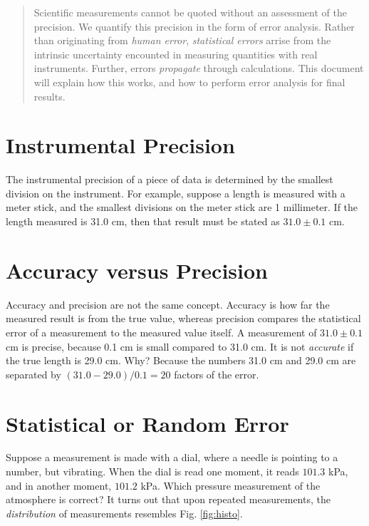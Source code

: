 \documentclass[12pt]{article}
\begin{document}
\maketitle

\begin{abstract}
Scientific measurements cannot be quoted without an assessment of the precision.  We quantify this precision in the form of error analysis.  Rather than originating from \textit{human error}, \textit{statistical errors} arrise from the intrinsic uncertainty encounted in measuring quantities with real instruments.  Further, errors \textit{propagate} through calculations.  This document will explain how this works, and how to perform error analysis for final results.
\end{abstract}

\section{Instrumental Precision}

The instrumental precision of a piece of data is determined by the smallest division on the instrument.  For example, suppose a length is measured with a meter stick, and the smallest divisions on the meter stick are 1 millimeter.  If the length measured is 31.0 cm, then that result must be stated as $31.0\pm0.1$ cm.

\section{Accuracy versus Precision}

Accuracy and precision are not the same concept.  Accuracy is how far the measured result is from the true value, whereas precision compares the statistical error of a measurement to the measured value itself.  A measurement of $31.0\pm0.1$ cm is precise, because 0.1 cm is small compared to 31.0 cm.  It is not \textit{accurate} if the true length is 29.0 cm.  Why? Because the numbers 31.0 cm and 29.0 cm are separated by $(31.0-29.0)/0.1 = 20$ factors of the error.

\section{Statistical or Random Error}

Suppose a measurement is made with a dial, where a needle is pointing to a number, but vibrating.  When the dial is read one moment, it reads $101.3$ kPa, and in another moment, $101.2$ kPa.  Which pressure measurement of the atmosphere is correct?  It turns out that upon repeated measurements, the \textit{distribution} of measurements resembles Fig. \ref{fig:histo}.
\end{document}
